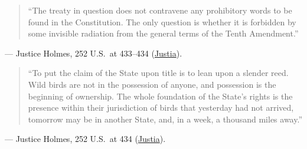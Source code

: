 \documentclass[12pt]{article}
\begin{document}
\begin{quote}
``The treaty in question does not contravene any prohibitory words to be found in the Constitution. The only question is whether it is forbidden by some invisible radiation from the general terms of the Tenth Amendment.''
\end{quote}
\noindent --- Justice Holmes, 252 U.S.\ at 433--434 (\href{https://supreme.justia.com/cases/federal/us/252/416/}{Justia}).

\begin{quote}
``To put the claim of the State upon title is to lean upon a slender reed. Wild birds are not in the possession of anyone, and possession is the beginning of ownership. The whole foundation of the State's rights is the presence within their jurisdiction of birds that yesterday had not arrived, tomorrow may be in another State, and, in a week, a thousand miles away.''
\end{quote}
\noindent --- Justice Holmes, 252 U.S.\ at 434 (\href{https://supreme.justia.com/cases/federal/us/252/416/}{Justia}).
\end{document}
